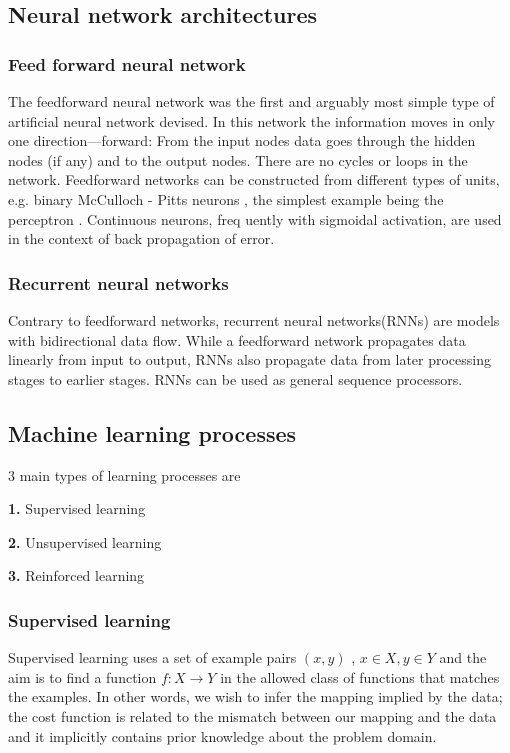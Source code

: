 \documentclass[12pt]{article}
\begin{document}
    \subsection{Neural network architectures}
    	\subsubsection{Feed forward neural network}
        The feedforward neural network was the first and arguably most simple type of artificial neural network devised. In this network the information moves in only one direction—forward: From the input nodes data goes through the hidden nodes  (if  any)  and  to  the  output  nodes.  There  are  no  cycles  or  loops  in  the  network.  Feedforward  networks  can  be constructed  from  different  types  of  units,  e.g.  binary McCulloch
-
Pitts  neurons
,  the  simplest  example  being  the 
perceptron
.  Continuous  neurons,  freq
uently  with  sigmoidal activation, are  used  in  the  context  of 
back  propagation
of error.
        \subsubsection{Recurrent neural networks}

        Contrary  to feedforward  networks, recurrent  neural  networks(RNNs)  are  models  with  bidirectional  data  flow. While  a  feedforward  network  propagates  data  linearly  from  input  to  output,  RNNs  also  propagate  data  from  later processing stages to earlier stages. RNNs can be used as general sequence processors.
    \subsection{Machine learning processes}
    3 main types of learning processes are 
    
       \qquad \textbf{1.} Supervised learning
       
       \qquad \textbf{2.} Unsupervised learning
       
       \qquad\textbf{3.} Reinforced learning
       
       
        \subsubsection{Supervised learning}
        Supervised learning uses a set of example pairs $(x,y)$ , $x \in X , y \in Y$ and the aim is to find a function $f : X \rightarrow Y $ in the allowed class of functions that matches the examples. In other words, we wish to infer the mapping implied by the data; the cost function is related to the mismatch between our mapping and the data and it implicitly contains prior knowledge about the problem domain.
\end{document}
